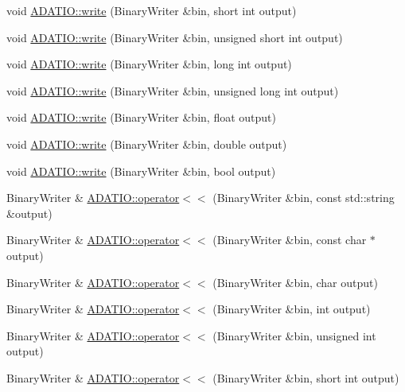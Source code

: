 \begin{DoxyCompactItemize}
\item 
void \mbox{\hyperlink{namespaceADATIO_a89bfc18eb2d40012f5b4ac105448d441}{A\+D\+A\+T\+I\+O\+::write}} (Binary\+Writer \&bin, short int output)
\item 
void \mbox{\hyperlink{namespaceADATIO_aed0610520a88cb6c8ba3cfd5b9ea2a8f}{A\+D\+A\+T\+I\+O\+::write}} (Binary\+Writer \&bin, unsigned short int output)
\item 
void \mbox{\hyperlink{namespaceADATIO_a163945e3b7a7ffeb94176c87d14dd21d}{A\+D\+A\+T\+I\+O\+::write}} (Binary\+Writer \&bin, long int output)
\item 
void \mbox{\hyperlink{namespaceADATIO_a68445b40d5732188a488e7b95b3cc6cc}{A\+D\+A\+T\+I\+O\+::write}} (Binary\+Writer \&bin, unsigned long int output)
\item 
void \mbox{\hyperlink{namespaceADATIO_a0bd8eac36791c194c12fd2005d87046d}{A\+D\+A\+T\+I\+O\+::write}} (Binary\+Writer \&bin, float output)
\item 
void \mbox{\hyperlink{namespaceADATIO_adc3666e3bf7803200f6dbd4eb96463fb}{A\+D\+A\+T\+I\+O\+::write}} (Binary\+Writer \&bin, double output)
\item 
void \mbox{\hyperlink{namespaceADATIO_a936b2163d1c60aa98f39841bed52f62a}{A\+D\+A\+T\+I\+O\+::write}} (Binary\+Writer \&bin, bool output)
\item 
Binary\+Writer \& \mbox{\hyperlink{namespaceADATIO_a10c403177088d104f13bd52cefae2a84}{A\+D\+A\+T\+I\+O\+::operator$<$$<$}} (Binary\+Writer \&bin, const std\+::string \&output)
\item 
Binary\+Writer \& \mbox{\hyperlink{namespaceADATIO_aa30c54a0a5271fc122506186fdf276c0}{A\+D\+A\+T\+I\+O\+::operator$<$$<$}} (Binary\+Writer \&bin, const char $\ast$output)
\item 
Binary\+Writer \& \mbox{\hyperlink{namespaceADATIO_a4b4f8d8951c5d9ed7f144ea43e01dd67}{A\+D\+A\+T\+I\+O\+::operator$<$$<$}} (Binary\+Writer \&bin, char output)
\item 
Binary\+Writer \& \mbox{\hyperlink{namespaceADATIO_a07c89597706480c0ec7b346192b1f121}{A\+D\+A\+T\+I\+O\+::operator$<$$<$}} (Binary\+Writer \&bin, int output)
\item 
Binary\+Writer \& \mbox{\hyperlink{namespaceADATIO_a9b4a06d24af68d2a6c22f575e0a0584a}{A\+D\+A\+T\+I\+O\+::operator$<$$<$}} (Binary\+Writer \&bin, unsigned int output)
\item 
Binary\+Writer \& \mbox{\hyperlink{namespaceADATIO_acfdbfb8beb266b5c5f28a065b0a2e4b5}{A\+D\+A\+T\+I\+O\+::operator$<$$<$}} (Binary\+Writer \&bin, short int output)

\end{DoxyCompactItemize}
